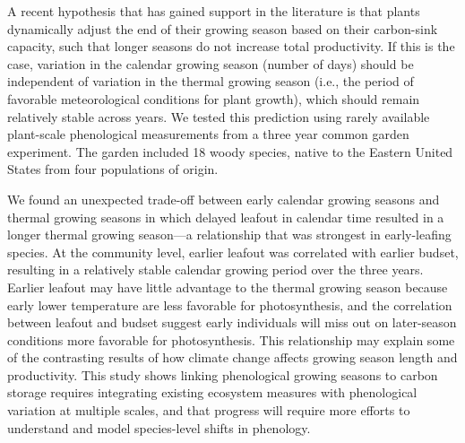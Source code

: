 \documentclass{article}[12pt]
\begin{document}
A recent hypothesis that has gained support in the literature is that plants dynamically adjust the end of their growing season based on their carbon-sink capacity, such that longer seasons do not increase total productivity. If this is the case, variation in the calendar growing season (number of days) should be independent of variation in the thermal growing season (i.e., the period of favorable meteorological conditions for plant growth), which should remain relatively stable across years. %
We tested this prediction using rarely available plant-scale phenological measurements from a three year common garden experiment. The garden included 18 woody species, native to the Eastern United States from four populations of origin. 

We found an unexpected trade-off between early calendar growing seasons and thermal growing seasons in which delayed leafout in calendar time resulted in a longer thermal growing season---a relationship that was strongest in early-leafing species. At the community level, earlier leafout was correlated with earlier budset, resulting in a relatively stable calendar growing period over the three years. 
Earlier leafout may have little advantage to the thermal growing season because early lower temperature are less favorable for photosynthesis, and the correlation between leafout and budset suggest early individuals will miss out on later-season conditions more favorable for photosynthesis. This relationship may explain some of the contrasting results of how climate change affects growing season length and productivity. This study shows linking phenological growing seasons to carbon storage requires integrating existing ecosystem measures with phenological variation at multiple scales, and that progress will require more efforts to understand and model species-level shifts in phenology.
\end{document}
